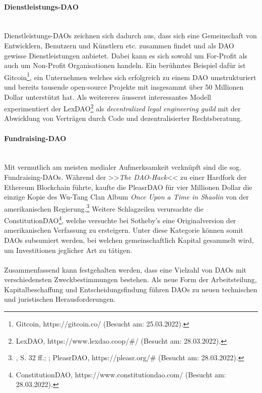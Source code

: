 \documentclass[a4paper,12pt]{report}
\begin{document}
        \paragraph{Dienstleistungs-DAO}\hfill \\
        Dienstleistungs-DAOs zeichnen sich dadurch aus, dass sich eine Gemeinschaft von Entwicklern, Benutzern und Künstlern etc. zusammen findet und als DAO gewisse Dienstleistungen anbietet. Dabei kann es sich sowohl um For-Profit als auch um Non-Profit Organisationen handeln. Ein berühmtes Beispiel dafür ist Gitcoin\footnote{\hspace{0.5em}\begin{minipage}[t]{13cm}Gitcoin, https://gitcoin.co/ (Besucht am: 25.03.2022).\end{minipage}}, ein Unternehmen welches sich erfolgreich zu einem DAO umstrukturiert und bereits tausende open-source Projekte mit insgesammt über 50 Millionen Dollar unterstützt hat. Als weitereres äusserst interessantes Modell experimentiert der LexDAO\footnote{\hspace{0.5em}\begin{minipage}[t]{13cm}LexDAO, https://www.lexdao.coop/\#/ (Besucht am: 28.03.2022).\end{minipage}} als \textit{decentralized legal engineering guild} mit der Abwicklung von Verträgen durch Code und dezentralisierter Rechtsberatung.
        
        \paragraph{Fundraising-DAO} \hfill \\
        Mit vermutlich am meisten medialer Aufmerksamkeit verknüpft sind die sog. Fundraising-DAOs. Während der >>\textit{The DAO-Hack}<< zu einer Hardfork der Ethereum Blockchain führte, kaufte die PleasrDAO für vier Millionen Dollar die einzige Kopie des Wu-Tang Clan Album \textit{Once Upon a Time in Shaolin} von der amerikanischen Regierung.\footnote{\hspace{0.5em}\begin{minipage}[t]{13cm}\citeauthor{MS19}, S. 32 ff.; \citeauthor{NYT}; PleasrDAO, https://pleasr.org/\# (Besucht am: 28.03.2022).\end{minipage}} Weitere Schlagzeilen verursachte die ConstitutionDAO\footnote{\hspace{0.5em}\begin{minipage}[t]{13cm}ConstitutionDAO, https://www.constitutiondao.com/ (Besucht am: 28.03.2022).\end{minipage}}, welche versuchte bei Sotheby’s eine Originalversion der amerikanischen Verfassung zu ersteigern. Unter diese Kategorie können somit  DAOs subsumiert werden, bei welchen gemeinschaftlich Kapital gesammelt wird, um Investitionen jeglicher Art zu tätigen. 
        \\
        \\
        Zusammenfassend kann festgehalten werden, dass eine Vielzahl von DAOs mit verschiedensten Zweckbestimmungen bestehen. Als neue Form der Arbeitsteilung, Kapitalbeschaffung und Entscheidungsfindung führen DAOs zu neuen technischen und juristischen Herausforderungen.
        \closesection
        
\end{document}
